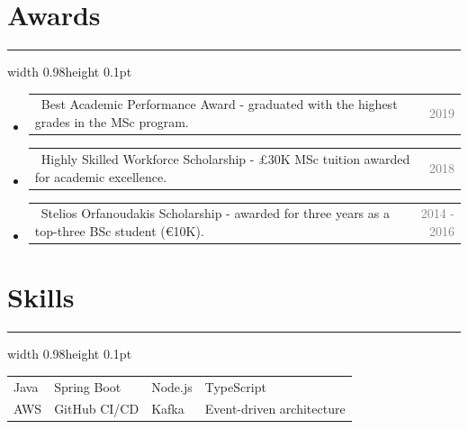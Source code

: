 \documentclass[a4paper,11pt]{article}
\makeatletter
\let\oldsection\section
\renewcommand{\section}[1]{
   \vspace{-3mm}
   \oldsection{\textbf\large{#1}}
   \vspace{-1.5mm}
   {\color{gray}\hrule width 0.98\textwidth height 0.1pt}
   \vspace{2mm}
}
\newcommand{\dateString}[1]{
   \textcolor{gray}{\small{#1}}
}
\newcommand{\achievementItem}[2]{
\vspace{0.5mm}\item
   \begin{tabular*}{0.98\textwidth}[t]{l@{\extracolsep{\fill}}r}
   \small{\textbullet\ #1} & \dateString{#2}
   \end{tabular*}
   \vspace{-2mm}
}
\newcommand{\multiSkillList}[8]{
   \begin{tabular*}{0.98\textwidth}{@{\extracolsep{\fill}}llll}
      \small{#1} & \small{#2} & \small{#3} & \small{#4} \\
      \small{#5} & \small{#6} & \small{#7} & \small{#8} \\
   \end{tabular*}
}
\newcommand{\resumeSubHeadingListStart}{\begin{itemize}[leftmargin=*,labelsep=0mm]}
\newcommand{\resumeSubHeadingListEnd}{\end{itemize}\vspace{2mm}}
\newcommand{\achievementItemSeparator}{\vspace{-1.0mm}}
\newcommand{\sectionSeparator}{\vspace{-2mm}}
\makeatother
\begin{document}
\sectionSeparator

\section{Awards}
\resumeSubHeadingListStart

\achievementItem
   {Best Academic Performance Award - graduated with the highest grades in the MSc program.}
   {2019}

\achievementItemSeparator

\achievementItem
   {Highly Skilled Workforce Scholarship - £30K MSc tuition awarded for academic excellence.}
   {2018}

\achievementItemSeparator

\achievementItem
   {Stelios Orfanoudakis Scholarship - awarded for three years as a top-three BSc student (€10K).}
   {2014 - 2016}

\resumeSubHeadingListEnd

\section{Skills}

\multiSkillList
   {Java}{Spring Boot}{Node.js}{TypeScript}
   {AWS}{GitHub CI/CD}{Kafka}{Event-driven architecture}
\end{document}

